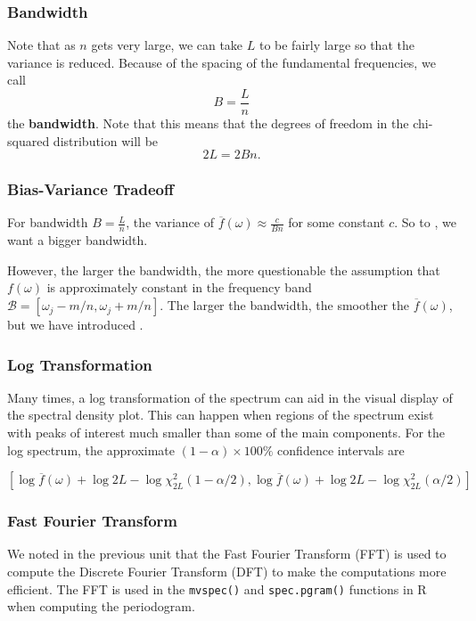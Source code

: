 \documentclass[%
xcolor=pdftex]{beamer}
\begin{document}
\begin{frame}
\frametitle{Bandwidth}

Note that as $n$ gets very large, we can take $L$ to be fairly
large so that the variance is reduced. Because of the spacing of the fundamental
frequencies, we call
\begin{equation} \label{eq:bandwidth}
B=\frac{L}{n}
\end{equation}
the \textbf{bandwidth}. Note that this means that the degrees of freedom
in the chi-squared distribution will be
$$
2L=2 B n.
$$

\end{frame}

\begin{frame}
\frametitle{Bias-Variance Tradeoff}

For bandwidth $B=\frac{L}{n}$, the variance of $\overline{f}(\omega) \approx \frac{c}{B n}$ for some constant $c$. So to \underline{\hspace{30 mm}}, we want a bigger bandwidth. \\
\vspace{5mm}

However, the larger the bandwidth, the more questionable the assumption that $f(\omega)$ is approximately constant in the frequency band $\mathcal{B}=[\omega_j-m/n, \omega_j+m/n]$. The larger the bandwidth, the smoother the $\overline{f}(\omega)$, but we have introduced \underline{\hspace{20 mm}}.

\end{frame}

\begin{frame}
\frametitle{Log Transformation}

Many times, a log transformation of the spectrum can aid in the visual display of the spectral density plot. This can happen when regions of the spectrum exist with peaks of interest much smaller than some of the main components. For the log spectrum, the approximate $(1-\alpha) \times 100\%$ confidence intervals are

\begin{equation} \label{eq:CIlog}
[ \log \overline{f}(\omega)  + \log 2L  - \log \chi_{2L}^2(1-\alpha/2) , \log \overline{f}(\omega) + \log 2L - \log \chi_{2L}^2(\alpha/2) ]
\end{equation}

\end{frame}

\begin{frame} [fragile]
\frametitle{Fast Fourier Transform}

We noted in the previous unit that the Fast Fourier Transform (FFT) is used to compute the Discrete Fourier Transform (DFT) to make the computations more efficient. The FFT is used in the \verb=mvspec()= and \verb=spec.pgram()= functions in R when computing the periodogram.



\end{frame}
\end{document}
